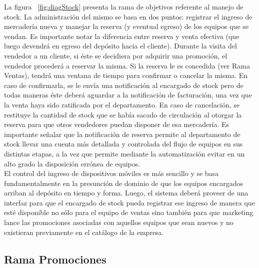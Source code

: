 La figura ~\ref{fig:diagStock} presenta la rama de objetivos referente al manejo de stock. La administración del mismo se basa en dos puntos: registrar el ingreso de mercadería nueva y manejar la reserva (y eventual egreso) de los equipos que se vendan. Es importante notar la diferencia entre reserva y venta efectiva (que luego devendrá en egreso del depósito hacia el cliente). Durante la visita del vendedor a un cliente, si éste se decidiera por adquirir una promoción, el vendedor procederá a reservar la misma. Si la reserva le es concedida (ver Rama Ventas), tendrá una ventana de tiempo para confirmar o cancelar la misma. En caso de confirmarla, se le envía una notificación al encargado de stock pero de todas maneras éste deberá aguardar a la notificación de facturación, una vez que la venta haya sido ratificada por el departamento. En caso de cancelación, se restituye la cantidad de stock que se había sacado de circulación al otorgar la reserva para que otros vendedores puedan disponer de esa mercadería. Es importante señalar que la notificación de reserva permite al departamento de stock llevar una cuenta más detallada y controlada del flujo de equipos en sus distintas etapas, a la vez que permite mediante la automatización evitar en un alto grado la disposición errónea de equipos. \\
\indent El control del ingreso de dispositivos móviles es más sencillo y se basa fundamentalmente en la presunción de dominio de que los equipos encargados arriban al depósito en tiempo y forma. Luego, el sistema deberá proveer de una interfaz para que el encargado de stock pueda registrar ese ingreso de manera que esté disponible no sólo para el equipo de ventas sino también para que marketing lance las promociones asociadas con aquellos equipos que sean nuevos y no existieran previamente en el catálogo de la empresa.

\subsection{Rama Promociones}

